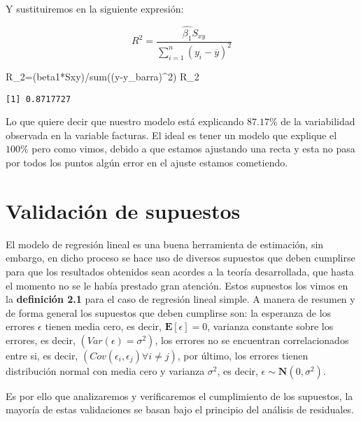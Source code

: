 \documentclass[
  a4paper,
  oneside,
  openany]{book}
\newenvironment{Shaded}{\begin{snugshade}}{\end{snugshade}}
\newcommand{\DecValTok}[1]{\textcolor[rgb]{0.00,0.00,0.81}{#1}}
\newcommand{\FunctionTok}[1]{\textcolor[rgb]{0.00,0.00,0.00}{#1}}
\newcommand{\NormalTok}[1]{#1}
\newcommand{\OtherTok}[1]{\textcolor[rgb]{0.56,0.35,0.01}{#1}}
\newcommand{\SpecialCharTok}[1]{\textcolor[rgb]{0.00,0.00,0.00}{#1}}
\begin{document}
Y sustituiremos en la siguiente expresión:

\[R^2=\frac{\hat{\beta_{1}}S_{xy}}{\sum_{i=1}^{n}(y_{i}-\overline{y})^2}\]

\begin{Shaded}
\begin{Highlighting}[]
\NormalTok{R\_2}\OtherTok{=}\NormalTok{(beta1}\SpecialCharTok{*}\NormalTok{Sxy)}\SpecialCharTok{/}\FunctionTok{sum}\NormalTok{((y}\SpecialCharTok{{-}}\NormalTok{y\_barra)}\SpecialCharTok{\^{}}\DecValTok{2}\NormalTok{)}
\NormalTok{R\_2}
\end{Highlighting}
\end{Shaded}

\begin{verbatim}
[1] 0.8717727
\end{verbatim}

Lo que quiere decir que nuestro modelo está explicando \(87.17\%\) de la variabilidad observada en la variable facturas. El ideal es tener un modelo que explique el \(100\%\) pero como vimos, debido a que estamos ajustando una recta y esta no pasa por todos los puntos algún error en el ajuste estamos cometiendo.

\hypertarget{validaciuxf3n-de-supuestos}{%
\chapter{Validación de supuestos}\label{validaciuxf3n-de-supuestos}}

El modelo de regresión lineal es una buena herramienta de estimación, sin embargo, en dicho proceso se hace uso de diversos supuestos que deben cumplirse para que los resultados obtenidos sean acordes a la teoría desarrollada, que hasta el momento no se le había prestado gran atención. Estos supuestos los vimos en la \textbf{definición 2.1} para el caso de regresión lineal simple.
A manera de resumen y de forma general los supuestos que deben cumplirse son: la esperanza de los errores \(\epsilon\) tienen media cero, es decir, \(\mathbf{E}[\epsilon]=0\), varianza constante sobre los errores, es decir, \((Var(\epsilon)=\sigma^2)\), los errores no se encuentran correlacionados entre si, es decir, \((Cov(\epsilon_{i},\epsilon_{j})\forall i\neq j)\), por último, los errores tienen distribución normal con media cero y varianza \(\sigma^2\), es decir, \(\epsilon \sim \mathbf{N}(0,\sigma^2).\)

Es por ello que analizaremos y verificaremos el cumplimiento de los supuestos, la mayoría de estas validaciones se basan bajo el principio del análisis de residuales.
\end{document}
